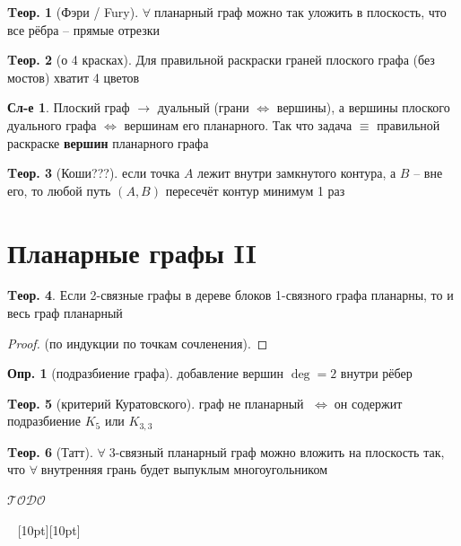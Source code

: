 \documentclass[a4paper,12pt]{article}
\theoremstyle{definition}
\newtheorem{definition}{Опр.}[section]
\theoremstyle{definition}
\newtheorem{theorem}{Tеор.}[section]
\newtheorem*{corollary}{Сл-е} %
\def\iiff{$\;\Longleftrightarrow\;$}
\def\iiany{$\forall\;$}
\def\iiTODO{\guillemotleft$\mathcal{TODO}$\guillemotright\textellipsis}
\begin{document}
\begin{theorem}[Фэри / Fury]
	\iiany планарный граф можно так уложить в плоскость, что все рёбра -- прямые отрезки 
\end{theorem}

\begin{theorem}[о 4 красках]
	Для правильной раскраски граней плоского графа (без мостов) хватит 4 цветов
\end{theorem}

\begin{corollary}
	Плоский граф $\longrightarrow$ дуальный (грани $\Leftrightarrow$ вершины), а вершины плоского дуального графа $\Leftrightarrow$ вершинам его планарного. Так что задача $\equiv$ правильной раскраске \textbf{вершин} планарного графа
\end{corollary}

\begin{theorem}[Коши???]
	если точка $A$ лежит внутри замкнутого контура, а $B$ -- вне его, то любой путь $(A,B)$ пересечёт контур минимум 1 раз
\end{theorem}


\section{Планарные графы II}

\begin{theorem}
	Если 2-связные графы в дереве блоков 1-связного графа планарны, то и весь граф планарный 
\end{theorem}
\begin{proof}
	(по индукции по точкам сочленения).
\end{proof}

\begin{definition}[подразбиение графа] добавление вершин $\deg=2$ внутри рёбер \end{definition}

\begin{theorem}[критерий Куратовского]
	граф не планарный \iiff он содержит подразбиение $K_5$ или $K_{3,3}$
\end{theorem}

\begin{theorem}[Татт]
	\iiany 3-связный планарный граф можно вложить на плоскость так, что \iiany внутренняя грань будет выпуклым многоугольником
\end{theorem}


\iiTODO



\vspace{48pt} \noindent \hrulefill~ \raisebox{-8pt}[10pt][10pt]{\Huge{}}~ \hrulefill
\end{document}
